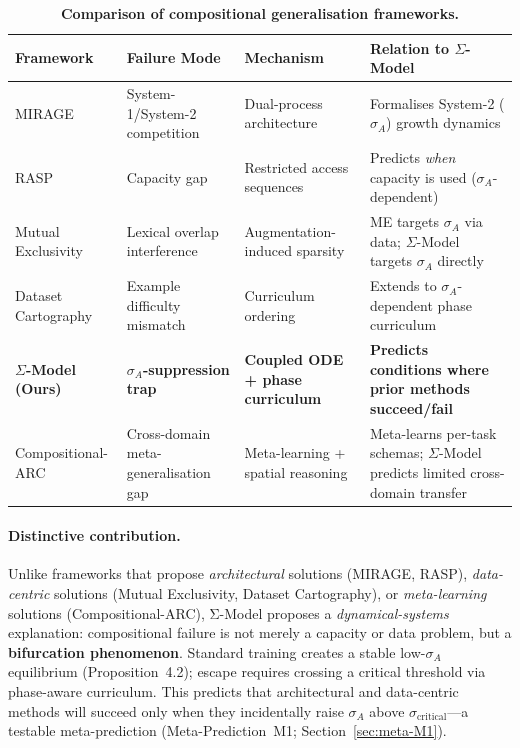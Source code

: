 \begin{table}[htbp]
\centering
\caption{\textbf{Comparison of compositional generalisation frameworks.}}
\label{tab:framework-comparison}
\small
\begin{tabular}{>{\raggedright\arraybackslash}p{2.2cm}>{\raggedright\arraybackslash}p{2.5cm}>{\raggedright\arraybackslash}p{2.5cm}>{\raggedright\arraybackslash}p{4.8cm}}
\toprule
\textbf{Framework} & \textbf{Failure Mode} & \textbf{Mechanism} & \textbf{Relation to $\Sigma$-Model} \\
\midrule
MIRAGE \citep{noviello2025neuroscienceinspiredualprocess}
  & System-1/System-2 competition
  & Dual-process architecture
  & Formalises System-2 ($\sigma_A$) growth dynamics \\

RASP \citep{bruns2025exploringcompositionalgeneralizationin}
  & Capacity gap
  & Restricted access sequences
  & Predicts \emph{when} capacity is used ($\sigma_A$-dependent) \\

Mutual Exclusivity \citep{jiang2022mutualexclusivity}
  & Lexical overlap interference
  & Augmentation-induced sparsity
  & ME targets $\sigma_A$ via data; $\Sigma$-Model targets $\sigma_A$ directly\\

Dataset Cartography \citep{swayamdipta2020datasetcartography}
  & Example difficulty mismatch
  & Curriculum ordering
  & Extends to $\sigma_A$-dependent phase curriculum \\

\textbf{$\Sigma$-Model (Ours)}
  & \textbf{$\sigma_A$-suppression trap}
  & \textbf{Coupled ODE + phase curriculum}
  & \textbf{Predicts conditions where prior methods succeed/fail} \\

Compositional-ARC \citep{mondorf2026compositionalarc}
  & Cross-domain meta-generalisation gap
  & Meta-learning + spatial reasoning
  & Meta-learns per-task schemas; $\Sigma$-Model predicts limited cross-domain transfer \\
\bottomrule
\end{tabular}
\end{table}

\paragraph{Distinctive contribution.}
Unlike frameworks that propose \emph{architectural} solutions (MIRAGE,
RASP), \emph{data-centric} solutions (Mutual Exclusivity, Dataset
Cartography), or \emph{meta-learning} solutions (Compositional-ARC),
Σ-Model proposes a \emph{dynamical-systems} explanation:
compositional failure is not merely a capacity or data problem, but a
\textbf{bifurcation phenomenon}. Standard training creates a stable
low-$\sigma_A$ equilibrium (Proposition~4.2); escape requires crossing
a critical threshold via phase-aware curriculum. This predicts that
architectural and data-centric methods will succeed only when they
incidentally raise $\sigma_A$ above $\sigma_{\text{critical}}$---a
testable meta-prediction (Meta-Prediction~M1; Section~\ref{sec:meta-M1}).

